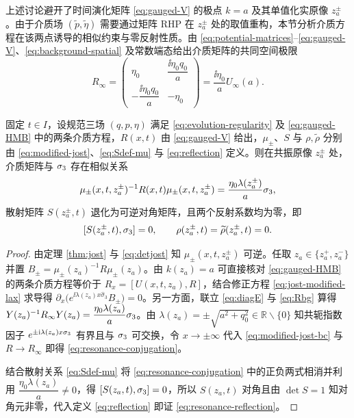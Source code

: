 上述讨论避开了时间演化矩阵 \eqref{eq:gauged-V} 的极点 $k=a$ 及其单值化实原像 $z_a^\pm$。由于介质场 $(\widetilde p,\widetilde\eta)$ 需要通过矩阵 RHP 在 $z_a^\pm$ 处的取值重构，本节分析介质方程在该两点诱导的相似约束与零反射性质。由 \eqref{eq:potential-matrices}--\eqref{eq:gauged-V}、\eqref{eq:background-spatial} 及常数端态给出介质矩阵的共同空间极限
\begin{equation}\label{eq:Rbg}
R_\infty=\begin{pmatrix}
\eta_0&\dfrac{\ii\eta_0q_0}{a}\\[6pt]
-\dfrac{\ii\eta_0q_0}{a}&-\eta_0
\end{pmatrix}
=\dfrac{\ii\eta_0}{a}U_\infty(a).
\end{equation}

\begin{proposition}\label{prop:resonance}
固定 $t\in I$，设规范三场 $(q,p,\eta)$ 满足 \eqref{eq:evolution-regularity} 及 \eqref{eq:gauged-HMB} 中的两条介质方程，$R(x,t)$ 由 \eqref{eq:gauged-V} 给出，$\mu_\pm$、$S$ 与 $\rho,\widetilde\rho$ 分别由 \eqref{eq:modified-jost}、\eqref{eq:Sdef-mu} 与 \eqref{eq:reflection} 定义。则在共振原像 $z_a^\pm$ 处，介质矩阵与 $\sigma_3$ 存在相似关系
\begin{equation}\label{eq:resonance-conjugation}
\mu_\pm(x,t,z_a^\pm)^{-1}R(x,t)\mu_\pm(x,t,z_a^\pm)
=\dfrac{\eta_0\lambda(z_a^\pm)}{a}\sigma_3,
\end{equation}
散射矩阵 $S(z_a^\pm,t)$ 退化为可逆对角矩阵，且两个反射系数均为零，即
\begin{equation}\label{eq:resonance-reflection}
[S(z_a^\pm,t),\sigma_3]=0,\qquad
\rho(z_a^\pm,t)=\widetilde\rho(z_a^\pm,t)=0.
\end{equation}
\end{proposition}
\begin{proof}
由定理 \ref{thm:jost} 与 \eqref{eq:detjost} 知 $\mu_\pm(x,t,z_a^\pm)$ 可逆。任取 $z_a\in\{z_a^+,z_a^-\}$ 并置 $B_\pm=\mu_\pm(z_a)^{-1}R\mu_\pm(z_a)$。由 $k(z_a)=a$ 可直接核对 \eqref{eq:gauged-HMB} 的两条介质方程等价于 $R_x=[U(x,t,z_a),R]$，结合修正方程 \eqref{eq:jost-modified-lax} 求导得 $\partial_x\bigl(e^{\ii\lambda(z_a)x\widehat{\sigma}_3}B_\pm\bigr)=0$。另一方面，联立 \eqref{eq:diagE} 与 \eqref{eq:Rbg} 算得 $Y(z_a)^{-1}R_\infty Y(z_a)=\dfrac{\eta_0\lambda(z_a)}{a}\sigma_3$。由 $\lambda(z_a)=\pm\sqrt{a^2+q_0^2}\in\mathbb R\mathbin{\backslash}\{0\}$ 知共轭指数因子 $e^{\pm\mathrm{i}\lambda(z_a)x\sigma_3}$ 有界且与 $\sigma_3$ 可交换，令 $x\to\pm\infty$ 代入 \eqref{eq:modified-jost-bc} 与 $R\to R_\infty$ 即得 \eqref{eq:resonance-conjugation}。

结合散射关系 \eqref{eq:Sdef-mu} 将 \eqref{eq:resonance-conjugation} 中的正负两式相消并利用 $\dfrac{\eta_0\lambda(z_a)}{a}\ne0$，得 $[S(z_a,t),\sigma_3]=0$，所以 $S(z_a,t)$ 对角且由 $\det S=1$ 知对角元非零，代入定义 \eqref{eq:reflection} 即证 \eqref{eq:resonance-reflection}。
\end{proof}

